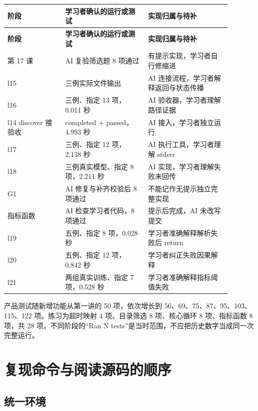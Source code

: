 {\small\setlength{\tabcolsep}{4pt}
\renewcommand{\arraystretch}{1.25}
\begin{longtable}{>{\raggedright\arraybackslash}p{0.23\linewidth}>{\raggedright\arraybackslash}p{0.33\linewidth}>{\raggedright\arraybackslash}p{0.33\linewidth}}
\toprule
\textbf{阶段} & \textbf{学习者确认的运行或测试} & \textbf{实现归属与待补} \\
\midrule\endfirsthead
\toprule
\textbf{阶段} & \textbf{学习者确认的运行或测试} & \textbf{实现归属与待补} \\
\midrule\endhead
\bottomrule\endfoot
第 17 课 & AI 复验筛选题 8 项通过 & 有提示实现，学习者自行修缩进 \\
l15 & 三例实际文件输出 & AI 连接流程，学习者解释返回与状态传播 \\
l16 & 三例、指定 13 项，0.011 秒 & AI 验收器，学习者理解路径证据 \\
l14 discover 接验收 & completed + passed，4.993 秒 & AI 接入，学习者独立运行 \\
l17 & 三例、指定 12 项，2.138 秒 & AI 执行工具，学习者理解 stderr \\
l18 & 三例真实模型、指定 8 项，2.211 秒 & AI 实现，学习者理解失败未回传 \\
G1 & AI 修复与补齐校验后 8 项通过 & 不能记作无提示独立完整实现 \\
指标函数 & AI 检查学习者代码，8 项通过 & 提示后完成，AI 未改写提交 \\
l19 & 五例、指定 8 项，0.028 秒 & 学习者准确解释解析失败后 return \\
l20 & 五例、指定 12 项，0.842 秒 & 学习者纠正失败因果解释 \\
l21 & 两组真实训练、指定 7 项，0.528 秒 & 学习者准确解释指标阈值失败 \\
\end{longtable}}

产品测试随新增功能从第一讲的 50 项，依次增长到 56、69、75、87、95、103、115、122 项。练习为超时映射 4 项、目录筛选 8 项、核心循环 8 项、指标函数 8 项，共 28 项。不同阶段的“Ran N tests”是当时范围，不应把历史数字当成同一次完整运行。

\section{复现命令与阅读源码的顺序}

\subsection{统一环境}


